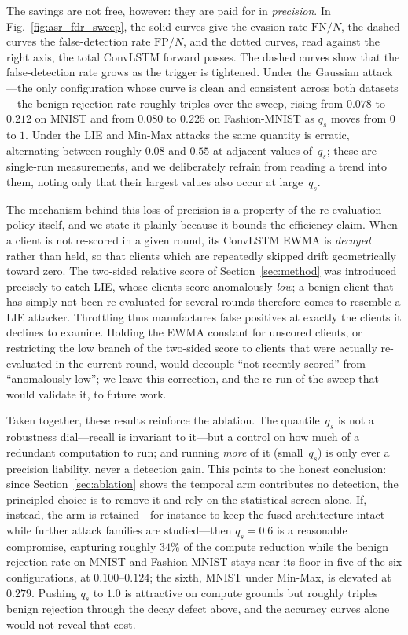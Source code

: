 \documentclass[journal]{IEEEtran}
\begin{document}
The savings are not free, however: they are paid for in \emph{precision}. In Fig.~\ref{fig:asr_fdr_sweep}, the solid curves give the evasion rate $\mathrm{FN}/N$, the dashed curves the false-detection rate $\mathrm{FP}/N$, and the dotted curves, read against the right axis, the total ConvLSTM forward passes. The dashed curves show that the false-detection rate grows as the trigger is tightened. Under the Gaussian attack---the only configuration whose curve is clean and consistent across both datasets---the benign rejection rate roughly triples over the sweep, rising from $0.078$ to $0.212$ on MNIST and from $0.080$ to $0.225$ on Fashion-MNIST as $q_s$ moves from $0$ to $1$. Under the LIE and Min-Max attacks the same quantity is erratic, alternating between roughly $0.08$ and $0.55$ at adjacent values of~$q_s$; these are single-run measurements, and we deliberately refrain from reading a trend into them, noting only that their largest values also occur at large~$q_s$.

The mechanism behind this loss of precision is a property of the re-evaluation policy itself, and we state it plainly because it bounds the efficiency claim. When a client is not re-scored in a given round, its ConvLSTM EWMA is \emph{decayed} rather than held, so that clients which are repeatedly skipped drift geometrically toward zero. The two-sided relative score of Section~\ref{sec:method} was introduced precisely to catch LIE, whose clients score anomalously \emph{low}; a benign client that has simply not been re-evaluated for several rounds therefore comes to resemble a LIE attacker. Throttling thus manufactures false positives at exactly the clients it declines to examine. Holding the EWMA constant for unscored clients, or restricting the low branch of the two-sided score to clients that were actually re-evaluated in the current round, would decouple ``not recently scored'' from ``anomalously low''; we leave this correction, and the re-run of the sweep that would validate it, to future work.

Taken together, these results reinforce the ablation. The quantile~$q_s$ is not a robustness dial---recall is invariant to it---but a control on how much of a redundant computation to run; and running \emph{more} of it (small~$q_s$) is only ever a precision liability, never a detection gain. This points to the honest conclusion: since Section~\ref{sec:ablation} shows the temporal arm contributes no detection, the principled choice is to remove it and rely on the statistical screen alone. If, instead, the arm is retained---for instance to keep the fused architecture intact while further attack families are studied---then $q_s = 0.6$ is a reasonable compromise, capturing roughly $34\%$ of the compute reduction while the benign rejection rate on MNIST and Fashion-MNIST stays near its floor in five of the six configurations, at $0.100$--$0.124$; the sixth, MNIST under Min-Max, is elevated at $0.279$. Pushing $q_s$ to $1.0$ is attractive on compute grounds but roughly triples benign rejection through the decay defect above, and the accuracy curves alone would not reveal that cost.
\end{document}
